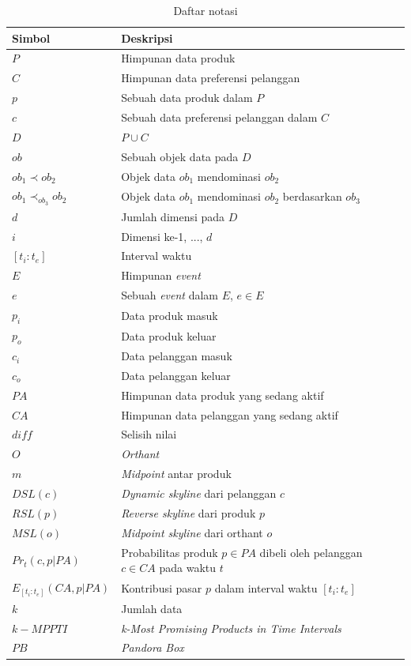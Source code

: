 \documentclass[conference]{IEEEtran}
\begin{document}
\begin{table}[htbp]
	\caption{Daftar notasi}
	\begin{center}
		\begin{tabular}{| p{2.5cm} | p{4.5cm} |}
		\hline
		\textbf{Simbol} & \textbf{Deskripsi} \\ \hline
		$P$ & Himpunan data produk\\ \hline
		$C$ & Himpunan data preferensi pelanggan\\ \hline
		$p$ & Sebuah data produk dalam $P$\\ \hline
		$c$ & Sebuah data preferensi pelanggan dalam $C$\\ \hline
		$D$ & $P \cup C$ \\ \hline
		$ob$ & Sebuah objek data pada $D$\\ \hline
		$ob_1 \prec ob_2$ & Objek data $ob_1$ mendominasi $ob_2$\\ \hline
		$ob_1 \prec_{ob_3} ob_2$ & Objek data $ob_1$ mendominasi $ob_2$ berdasarkan $ob_3$\\ \hline
		$d$ & Jumlah dimensi pada $D$\\ \hline
		$i$ & Dimensi ke-1, ..., $d$\\ \hline
		$[t_i:t_e]$ & Interval waktu \\ \hline
		$E$ & Himpunan \textit{event} \\ \hline
		$e$ & Sebuah \textit{event} dalam $E$, $e \in E$ \\ \hline
		$p_{i}$ & Data produk masuk \\ \hline
		$p_{o}$ & Data produk keluar \\ \hline
		$c_{i}$ & Data pelanggan masuk \\ \hline
		$c_{o}$ & Data pelanggan keluar \\ \hline
		$PA$ & Himpunan data produk yang sedang aktif \\ \hline	
		$CA$ & Himpunan data pelanggan yang sedang aktif \\ \hline
		$diff$ & Selisih nilai \\ \hline
		$O$ & \textit{Orthant}\\ \hline
		$m$ & \textit{Midpoint} antar produk\\ \hline
		$DSL(c)$ & \textit{Dynamic skyline} dari pelanggan $c$\\ \hline
		$RSL(p)$ & \textit{Reverse skyline} dari produk $p$\\ \hline
		$MSL(o)$ & \textit{Midpoint skyline} dari orthant $o$\\ \hline
		$Pr_t(c, p|PA)$ & Probabilitas produk $p \in PA$ dibeli oleh pelanggan $c \in CA$ pada waktu $t$ \\ \hline
		$E_{[t_i:t_e]}(CA, p|PA)$ & Kontribusi pasar $p$ dalam interval waktu $[t_i:t_e]$\\ \hline
		$k$ & Jumlah data \\ \hline
		$k-MPPTI$ & \textit{k-Most Promising Products in Time Intervals} \\ \hline
		$PB$ & \textit{Pandora Box} \\ \hline
		\end{tabular}
		\label{tab:notasi}
	\end{center}
\end{table}
\end{document}
